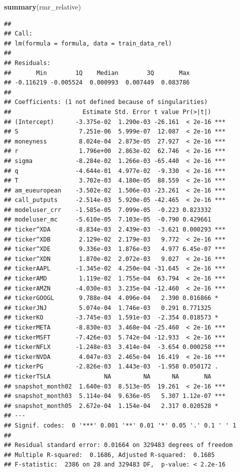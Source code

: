 \documentclass[
]{article}
\newenvironment{Shaded}{\begin{snugshade}}{\end{snugshade}}
\newcommand{\FunctionTok}[1]{\textcolor[rgb]{0.13,0.29,0.53}{\textbf{#1}}}
\newcommand{\NormalTok}[1]{#1}
\begin{document}
\begin{Shaded}
\begin{Highlighting}[]
\FunctionTok{summary}\NormalTok{(rmr\_relative)}
\end{Highlighting}
\end{Shaded}

\begin{verbatim}
## 
## Call:
## lm(formula = formula, data = train_data_rel)
## 
## Residuals:
##       Min        1Q    Median        3Q       Max 
## -0.116219 -0.005524  0.000993  0.007449  0.083786 
## 
## Coefficients: (1 not defined because of singularities)
##                    Estimate Std. Error t value Pr(>|t|)    
## (Intercept)      -3.375e-02  1.290e-03 -26.161  < 2e-16 ***
## S                 7.251e-06  5.999e-07  12.087  < 2e-16 ***
## moneyness         8.024e-04  2.873e-05  27.927  < 2e-16 ***
## r                 1.796e+00  2.863e-02  62.746  < 2e-16 ***
## sigma            -8.284e-02  1.266e-03 -65.440  < 2e-16 ***
## q                -4.644e-01  4.977e-02  -9.330  < 2e-16 ***
## T                 3.702e-03  4.180e-05  88.559  < 2e-16 ***
## am_eueuropean    -3.502e-02  1.506e-03 -23.261  < 2e-16 ***
## call_putputs     -2.514e-03  5.920e-05 -42.465  < 2e-16 ***
## modeluser_crr    -1.585e-05  7.099e-05  -0.223 0.823332    
## modeluser_mc     -5.610e-05  7.103e-05  -0.790 0.429661    
## ticker^XDA       -8.834e-03  2.439e-03  -3.621 0.000293 ***
## ticker^XDB        2.129e-02  2.179e-03   9.772  < 2e-16 ***
## ticker^XDE        9.336e-03  1.876e-03   4.977 6.45e-07 ***
## ticker^XDN        1.870e-02  2.072e-03   9.027  < 2e-16 ***
## tickerAAPL       -1.345e-02  4.250e-04 -31.645  < 2e-16 ***
## tickerAMD         1.119e-02  1.755e-04  63.794  < 2e-16 ***
## tickerAMZN       -4.030e-03  3.235e-04 -12.460  < 2e-16 ***
## tickerGOOGL       9.788e-04  4.096e-04   2.390 0.016866 *  
## tickerJNJ         5.074e-04  1.746e-03   0.291 0.771325    
## tickerKO         -3.745e-03  1.591e-03  -2.354 0.018573 *  
## tickerMETA       -8.830e-03  3.468e-04 -25.460  < 2e-16 ***
## tickerMSFT       -7.426e-03  5.742e-04 -12.933  < 2e-16 ***
## tickerNFLX       -1.248e-03  3.414e-04  -3.654 0.000258 ***
## tickerNVDA        4.047e-03  2.465e-04  16.419  < 2e-16 ***
## tickerPG         -2.826e-03  1.443e-03  -1.958 0.050172 .  
## tickerTSLA               NA         NA      NA       NA    
## snapshot_month02  1.640e-03  8.513e-05  19.261  < 2e-16 ***
## snapshot_month03  5.114e-04  9.636e-05   5.307 1.12e-07 ***
## snapshot_month05  2.672e-04  1.154e-04   2.317 0.020528 *  
## ---
## Signif. codes:  0 '***' 0.001 '**' 0.01 '*' 0.05 '.' 0.1 ' ' 1
## 
## Residual standard error: 0.01664 on 329483 degrees of freedom
## Multiple R-squared:  0.1686, Adjusted R-squared:  0.1685 
## F-statistic:  2386 on 28 and 329483 DF,  p-value: < 2.2e-16
\end{verbatim}
\end{document}
